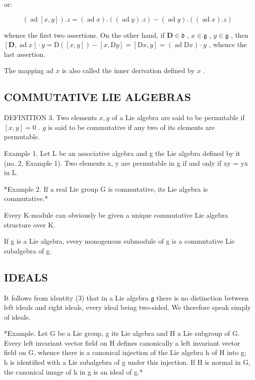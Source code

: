 or:

\[
(\operatorname{ad} [ x, y ]). z = (\operatorname{ad} x). ((\operatorname{ad} y). z) - (\operatorname{ad} y). ((\operatorname{ad} x). z)
\]

whence the first two assertions. On the other hand, if \(\mathbf{D} \in \mathfrak{d}\) , \(x \in \mathfrak{g}\) , \(y \in \mathfrak{g}\) , then \([\mathbf{D}, \operatorname{ad} x] \cdot y = \mathrm{D}([x, y]) - [x, \mathrm{D}y] = [\mathrm{D}x, y] = (\operatorname{ad} \mathrm{D}x) \cdot y\) , whence the last assertion.

The mapping ad \(x\) is also called the inner derivation defined by \(x\) .

\subsection{COMMUTATIVE LIE ALGEBRAS}

DEFINITION 3. Two elements \(x, y\) of a Lie algebra are said to be permutable if \([x, y] = 0\) . \(g\) is said to be commutative if any two of its elements are permutable.

Example 1. Let L be an associative algebra and g the Lie algebra defined by it (no. 2, Example 1). Two elements x, y are permutable in g if and only if xy = yx in L.

*Example 2. If a real Lie group G is commutative, its Lie algebra is commutative.*

Every K-module can obviously be given a unique commutative Lie algebra structure over K.

If g is a Lie algebra, every monogenous submodule of g is a commutative Lie subalgebra of g.

\subsection{IDEALS}

It follows from identity (3) that in a Lie algebra \(\mathfrak{g}\) there is no distinction between left ideals and right ideals, every ideal being two-sided. We therefore speak simply of ideals.

*Example. Let G be a Lie group, g its Lie algebra and H a Lie subgroup of G. Every left invariant vector field on H defines canonically a left invariant vector field on G, whence there is a canonical injection of the Lie algebra h of H into g; h is identified with a Lie subalgebra of g under this injection. If H is normal in G, the canonical image of h in g is an ideal of g.*

